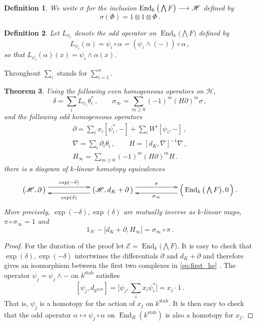 \documentclass[english,letter paper,12pt,leqno]{article}
\newtheorem{theorem}{Theorem}[section]
\theoremstyle{example}
\newtheorem{definition}[theorem]{Definition}
\numberwithin{equation}{section}
\def\stab{\operatorname{stab}}
\def\be{\begin{equation}}
\def\ee{\end{equation}}
\DeclareMathOperator{\End}{End}
\begin{document}
\begin{definition} We write $\sigma$ for the inclusion $\End_k\big( \bigwedge F \big) \lto \mathscr{H}$ defined by
\[
\sigma( \Phi ) = 1 \otimes 1 \otimes \Phi\,.
\]
\end{definition}

\begin{definition}\label{defn:lpsi} Let $L_{\psi_i}$ denote the odd operator on $\End_k\big( \bigwedge F \big)$ defined by
\[
L_{\psi_i}( \alpha ) = \psi_i \circ \alpha = (\psi_i \wedge (-)) \circ \alpha\,,
\]
so that $L_{\psi_i}(\alpha)(x) = \psi_i \wedge \alpha(x)$.
\end{definition}

Throughout $\sum_i$ stands for $\sum_{i=1}^n$.

\begin{theorem}\label{theorem:main_retract} Using the following even homogeneous operators on $\mathscr{H}$,
\be
\delta = \sum_i L_{\psi_i} \theta_i^*\,, \qquad \sigma_\infty = \sum_{m \ge 0} (-1)^m (H \partial)^m \sigma\,,\label{eq:sigmainftyorig}
\ee
and the following odd homogeneous operators
\begin{gather}
\partial = \sum_i x_i [\psi_i^*,-] + \sum_i W^i [\psi_i,-]\,,\\
\nabla = \sum_i \partial_i \theta_i\,, \qquad H = [d_K, \nabla]^{-1} \nabla\,,\label{defn:Horiginal}\\
H_\infty = \sum_{m \ge 0} (-1)^m (H \partial)^m H\,.\label{eq:hinftyorig}
\end{gather}
there is a diagram of $k$-linear homotopy equivalences
\be\label{eq:first_he}
\xymatrix@C+3pc{
\big( \mathscr{H}, \partial \,\big) \ar@<1ex>[r]^-{\exp(-\delta)} & \big( \mathscr{H}, d_K + \partial \,\big) \ar@<1ex>[l]^-{ \exp(\delta) } \ar@<1ex>[r]^-{\pi} & \Big( \End_k\big( \bigwedge F \big), 0 \,\Big)\,.\ar@<1ex>[l]^-{ \sigma_\infty }
}
\ee
More precisely, $\exp(-\delta), \exp(\delta)$ are mutually inverse as $k$-linear maps, $\pi \circ \sigma_\infty = 1$ and
\be
1_{\mathscr{H}} - \big[ d_K + \partial, H_\infty \big] = \sigma_\infty \circ \pi\,.
\ee
\end{theorem}
\begin{proof}
For the duration of the proof let $\mathscr{E} = \End_k\big( \bigwedge F \big)$. It is easy to check that $\exp(\delta),\exp(-\delta)$ intertwines the differentials $\partial$ and $d_K + \partial$ and therefore gives an isomorphism between the first two complexes in \eqref{eq:first_he} \cite[Proposition 4.11]{murfet}. The operator $\psi_j = \psi_j \wedge -$ on $k^{\stab}$ satisfies
\[
[ \psi_j, d_{k^{\stab}} ] = \big[ \psi_j, \sum_i x_i \psi_i^* \big] = x_j \cdot 1\,.
\]
That is, $\psi_j$ is a homotopy for the action of $x_j$ on $k^{\stab}$. It is then easy to check that the odd operator $\alpha \mapsto \psi_j \circ \alpha$ on $\End_R(k^{\stab})$ is also a homotopy for $x_j$.
\end{proof}
\end{document}
